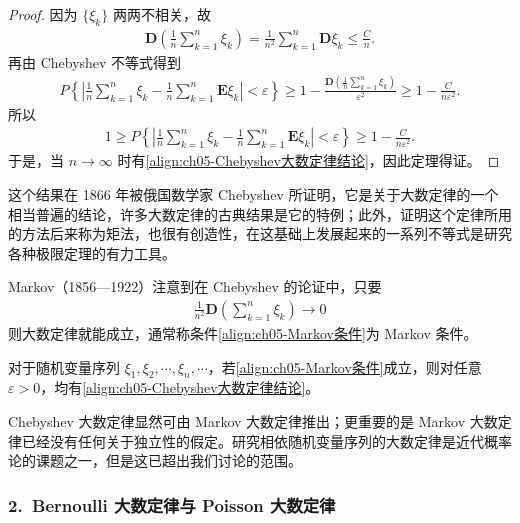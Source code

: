 \documentclass[../../main.tex]{subfiles}
\begin{document}
\begin{proof}
因为 $\{\xi_k\}$ 两两不相关，故
\begin{align*}
\boldsymbol{D}\!\left(\frac1n\sum_{k=1}^{n}\xi_k\right)=\frac{1}{n^{2}}\sum_{k=1}^{n}\boldsymbol{D}\xi_k\leqslant\frac{C}{n}.
\end{align*}
再由 Chebyshev 不等式得到
\begin{align*}
P\!\left\{\left|\frac1n\sum_{k=1}^{n}\xi_k-\frac1n\sum_{k=1}^{n}\boldsymbol{E}\xi_k\right|<\varepsilon\right\}
\geqslant 1-\frac{\boldsymbol{D}\!\left(\frac1n\sum_{k=1}^{n}\xi_k\right)}{\varepsilon^{2}}
\geqslant 1-\frac{C}{n\varepsilon^{2}}.
\end{align*}
所以
\begin{align*}
1\geqslant P\!\left\{\left|\frac1n\sum_{k=1}^{n}\xi_k-\frac1n\sum_{k=1}^{n}\boldsymbol{E}\xi_k\right|<\varepsilon\right\}\geqslant 1-\frac{C}{n\varepsilon^{2}}.
\end{align*}
于是，当 $n\to\infty$ 时有\cref{align:ch05-Chebyshev大数定律结论}，因此定理得证。
\end{proof}

这个结果在 1866 年被俄国数学家 Chebyshev 所证明，它是关于大数定律的一个相当普遍的结论，许多大数定律的古典结果是它的特例；此外，证明这个定律所用的方法后来称为矩法，也很有创造性，在这基础上发展起来的一系列不等式是研究各种极限定理的有力工具。

Markov（1856—1922）注意到在 Chebyshev 的论证中，只要
\begin{align}
\frac{1}{n^{2}}\boldsymbol{D}\!\left(\sum_{k=1}^{n}\xi_k\right)\to 0\label{align:ch05-Markov条件}
\end{align}
则大数定律就能成立，通常称条件\cref{align:ch05-Markov条件}为 Markov 条件。

\begin{theorem}\label{theorem:ch05-Markov大数定律}
对于随机变量序列 $\xi_1,\xi_2,\cdots,\xi_n,\cdots$，若\cref{align:ch05-Markov条件}成立，则对任意 $\varepsilon>0$，均有\cref{align:ch05-Chebyshev大数定律结论}。
\end{theorem}

Chebyshev 大数定律显然可由 Markov 大数定律推出；更重要的是 Markov 大数定律已经没有任何关于独立性的假定。研究相依随机变量序列的大数定律是近代概率论的课题之一，但是这已超出我们讨论的范围。

\subsubsection*{2.\ Bernoulli 大数定律与 Poisson 大数定律}
\end{document}

